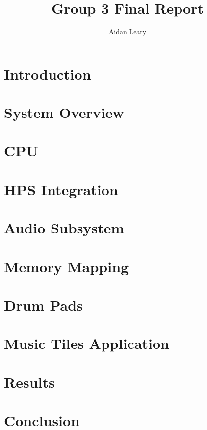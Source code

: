 \documentclass[10pt, letterpaper]{IEEEconf}
\title{Group 3 Final Report}
\author{Aidan Leary}
\begin{document}
  \maketitle

  \begin{abstract} 
  \end{abstract}

  \section{Introduction} 
  

  \section{System Overview}
  

  \section{CPU}
  

  \section{HPS Integration}
  

  \section{Audio Subsystem}
  

  \section{Memory Mapping}
  

  \section{Drum Pads}
  

  \section{Music Tiles Application}
  

  \section{Results}
  

  \section{Conclusion}
  

  \cite{TestResource}

  \printbibliography
  
\end{document}
